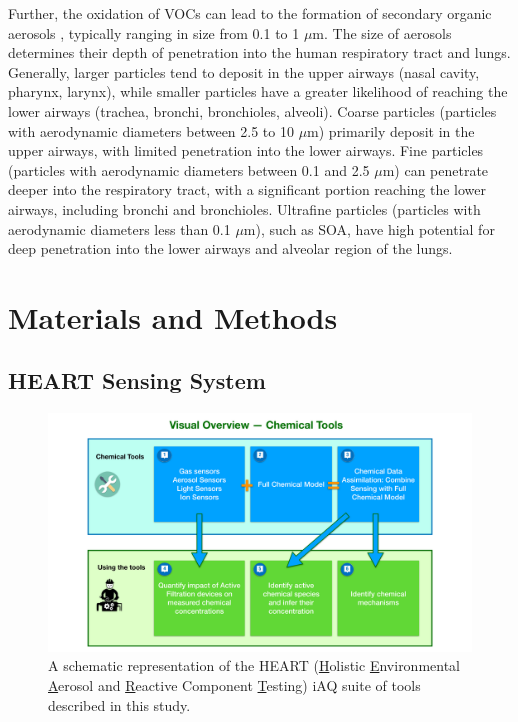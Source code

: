 \documentclass[journal=jacsat,manuscript=article]{achemso}
\begin{document}
Further, the oxidation of VOCs can lead to the formation of secondary organic aerosols \citep{Joo:2021, Claeys2004FormationOS, Srivastava2022FormationOS, Fan2022ARO}, typically ranging in size from 0.1 to 1 $\mu$m. The size of aerosols determines their depth of penetration into the human respiratory tract and lungs. Generally, larger particles tend to deposit in the upper airways (nasal cavity, pharynx, larynx), while smaller particles have a greater likelihood of reaching the lower airways (trachea, bronchi, bronchioles, alveoli). Coarse particles (particles with aerodynamic diameters between 2.5 to 10 $\mu$m) primarily deposit in the upper airways, with limited penetration into the lower airways. Fine particles (particles with aerodynamic diameters between 0.1 and 2.5 $\mu$m) can penetrate deeper into the respiratory tract, with a significant portion reaching the lower airways, including bronchi and bronchioles. Ultrafine particles (particles with aerodynamic diameters less than 0.1 $\mu$m), such as SOA, have high potential for deep penetration into the lower airways and alveolar region of the lungs.

\section{Materials and Methods}

\subsection{HEART Sensing System}

\begin{figure}[t!]
  \includegraphics[width=\textwidth]{Figures/ChemicalTools.pdf}
  \vspace{-0.2in}
  \caption{A schematic representation of the HEART (\underline{H}olistic \underline{E}nvironmental \underline{A}erosol and \underline{R}eactive Component \underline{T}esting) iAQ suite of tools described in this study.}
  \label{Figure:ChemicalTools}
\end{figure}
\end{document}
